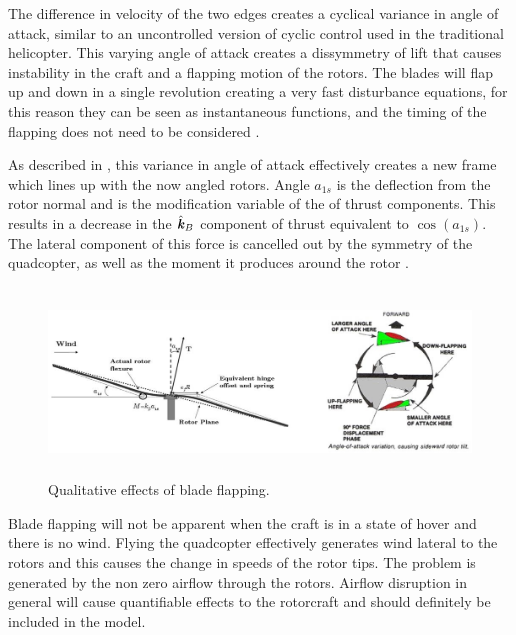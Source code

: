 The difference in velocity of the two edges creates a cyclical variance in angle of attack, similar to an uncontrolled version of cyclic control used in the traditional helicopter. This varying angle of attack creates a dissymmetry of lift that causes instability in the craft and a flapping motion of the rotors. The blades will flap up and down in a single revolution creating a very fast disturbance equations, for this reason they can be seen as instantaneous functions, and the timing of the flapping does not need to be considered \cite{Pounds2006}.

As described in \cite{Hoffmann, Pounds2006}, this variance in angle of attack effectively creates a new frame which lines up with the now angled rotors. Angle $a_{1s}$ is the deflection from the rotor normal and is the modification variable of the of thrust components. This results in a decrease in the $\hat{\textbf{\textit{k}}}_B$ component of thrust equivalent to $\cos (a_{1s})$. The lateral component of this force is cancelled out by the symmetry of the quadcopter, as well as the moment it produces around the rotor \cite{Hoffmann}.

\begin{figure}[H]
\centering
\includegraphics[height = 5cm]{Images/Literature/BladeFlapping3}     
\caption{Qualitative effects of blade flapping.}
\label{IM_BladeFlapping}
\end{figure}

Blade flapping will not be apparent when the craft is in a state of hover and there is no wind. Flying the quadcopter effectively generates wind lateral to the rotors and this causes the change in speeds of the rotor tips. The problem is generated by the non zero airflow through the rotors. Airflow disruption in general will cause quantifiable effects to the rotorcraft and should definitely be included in the model.

